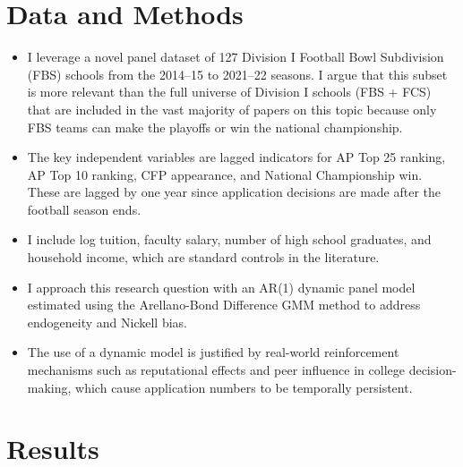 \documentclass{article}
\begin{document}
\section{Data and Methods}

\begin{itemize}

    \item I leverage a novel panel dataset of 127 Division I Football Bowl Subdivision (FBS) schools from the 2014–15 to 2021–22 seasons. I argue that this subset is more relevant than the full universe of Division I schools (FBS + FCS) that are included in the vast majority of papers on this topic because only FBS teams can make the playoffs or win the national championship.

    \item The key independent variables are lagged indicators for AP Top 25 ranking, AP Top 10 ranking, CFP appearance, and National Championship win. These are lagged by one year since application decisions are made after the football season ends.

    \item I include log tuition, faculty salary, number of high school graduates, and household income, which are standard controls in the literature. 

    \item I approach this research question with an AR(1) dynamic panel model estimated using the Arellano-Bond Difference GMM method to address endogeneity and Nickell bias.

    \item The use of a dynamic model is justified by real-world reinforcement mechanisms such as reputational effects and peer influence in college decision-making, which cause application numbers to be temporally persistent.
    
\end{itemize}

\section{Results}
\end{document}
